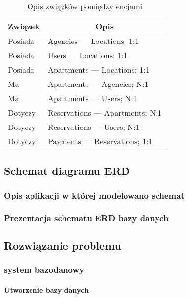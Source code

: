 \documentclass[polish, 11pt]{article}
\begin{document}
            \begin{table}[H]
                \centering
                \caption{Opis związków pomiędzy encjami}\label{tab:relations}
                \begin{tabular}{ll}\toprule
                    \multicolumn{1}{c}{Związek}	&	\multicolumn{1}{c}{Opis}	\\\midrule
                    Posiada	&	Agencies --- Locations; 1:1	\\
                    Posiada	&	Users --- Locations; 1:1	\\
                    Posiada	&	Apartments --- Locations; 1:1	\\
                    Ma	&	Apartments --- Agencies; N:1	\\
                    Ma	&	Apartments --- Users; N:1	\\
                    Dotyczy	&	Reservations --- Apartments; N:1	\\
                    Dotyczy	&	Reservations --- Users; N:1	\\
                    Dotyczy	&	Payments --- Reservations; 1:1	\\
                \bottomrule
                \end{tabular}
            \end{table}

    \subsection{Schemat diagramu ERD}
	    \subsubsection{Opis aplikacji w której modelowano schemat}
	    
	    \subsubsection{Prezentacja schematu ERD bazy danych}

    \subsection{Rozwiązanie problemu}
	    \subsubsection{system bazodanowy}
		    \paragraph{Utworzenie bazy danych}
		    
\end{document}
